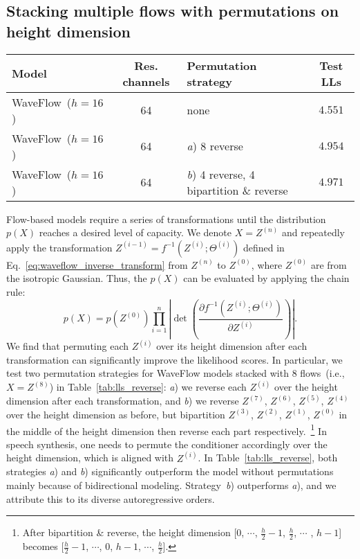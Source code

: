 \documentclass{article}
\begin{document}
\subsection{Stacking multiple flows with permutations on height dimension}
\label{subsec:stacking_permutate}
\vspace{-0.1em}
\begin{table*}[t!]
\centering
\caption{The test LLs of WaveFlow with different permutation strategies. All models consist of $8$ flows and each flow has $8$ convolutional layers with filter sizes $3$.}
\vspace{0.1em}
\begin{tabular}{l|c|l|c}
\hline 
{Model} & Res. channels  & \qquad\qquad Permutation strategy & Test LLs
\\ \hline
WaveFlow~($h=16$) & 64 &  none & $4.551$ \\ 
WaveFlow~($h=16$) & 64 & \emph{a}) 8 reverse   & $4.954$ \\ 
WaveFlow~($h=16$) & 64 & \emph{b}) 4 reverse, 4 bipartition \& reverse & $4.971$ \\ 
\hline
\end{tabular}
\label{tab:lls_reverse}
\end{table*}
Flow-based models require a series of transformations until the distribution $p(X)$ reaches a desired level of capacity.
We denote $X = Z^{(n)}$ and repeatedly apply the transformation $Z^{(i-1)} = f^{-1} (Z^{(i)}; \Theta^{(i)})$ defined in Eq.~\eqref{eq:waveflow_inverse_transform} from $Z^{(n)}$ to  $Z^{(0)}$, where $Z^{(0)}$ are from the isotropic Gaussian.
Thus, the $p(X)$ can be evaluated by applying the chain rule:
$$
p(X) = p(Z^{(0)}) \prod_{i=1}^n \left| \det\left( \frac{\partial f^{-1}(Z^{(i)}; \Theta^{(i)}) }{\partial Z^{(i)}} \right) \right| .
$$
We find that permuting each $Z^{(i)}$ over its height dimension after each transformation can significantly improve the likelihood scores.
In particular, we test two permutation strategies for WaveFlow models stacked with 8 flows~(i.e., $X = Z^{(8)}$) in Table~\ref{tab:lls_reverse}: \emph{a}) we reverse each $Z^{(i)}$ over the height dimension after each transformation, and \emph{b}) we reverse $Z^{(7)}$, $Z^{(6)}$, $Z^{(5)}$, $Z^{(4)}$ over the height dimension as before, but bipartition $Z^{(3)}$, $Z^{(2)}$, $Z^{(1)}$, $Z^{(0)}$ in the middle of the height dimension then reverse each part respectively.~\footnote{After bipartition \& reverse, the height dimension [0, $\cdots$, $\frac{h}{2}-1$, $\frac{h}{2}$, $\cdots$ , $h-1$] becomes [$\frac{h}{2}-1$, $\cdots$, 0, $h-1$, $\cdots$, $\frac{h}{2}$].}
In speech synthesis, one needs to permute the conditioner accordingly over the height dimension, which is aligned with $Z^{(i)}$.
In Table~\ref{tab:lls_reverse}, both strategies \emph{a}) and \emph{b}) significantly outperform the model without permutations mainly because of bidirectional modeling. Strategy~\emph{b}) outperforms \emph{a}), and we attribute this to its diverse autoregressive orders.
\end{document}
